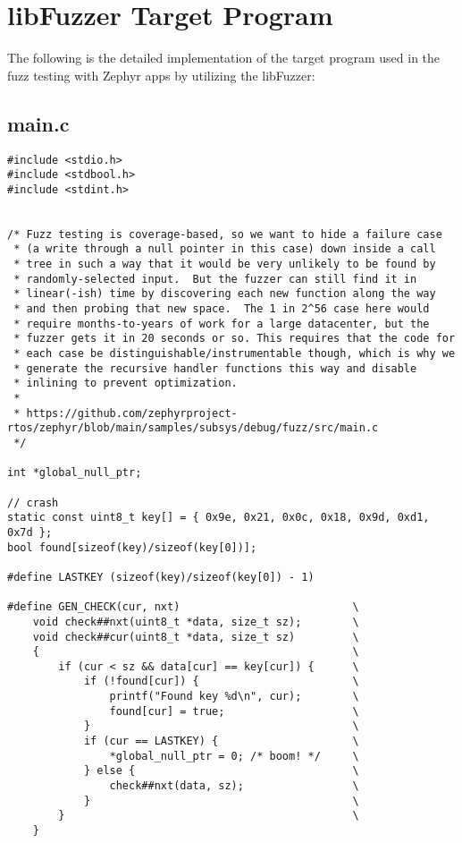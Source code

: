 
\chapter{libFuzzer Target Program}\label{appx:second}
The following is the detailed implementation of the
target program\cite{FuzzingE54:online}\cite{zephyrsa35:online} used in
the fuzz testing with Zephyr apps by utilizing the libFuzzer:

\section*{main.c}
\begin{verbatim}
#include <stdio.h>
#include <stdbool.h>
#include <stdint.h>


/* Fuzz testing is coverage-based, so we want to hide a failure case
 * (a write through a null pointer in this case) down inside a call
 * tree in such a way that it would be very unlikely to be found by
 * randomly-selected input.  But the fuzzer can still find it in
 * linear(-ish) time by discovering each new function along the way
 * and then probing that new space.  The 1 in 2^56 case here would
 * require months-to-years of work for a large datacenter, but the
 * fuzzer gets it in 20 seconds or so. This requires that the code for
 * each case be distinguishable/instrumentable though, which is why we
 * generate the recursive handler functions this way and disable
 * inlining to prevent optimization.
 *
 * https://github.com/zephyrproject-rtos/zephyr/blob/main/samples/subsys/debug/fuzz/src/main.c
 */

int *global_null_ptr;

// crash
static const uint8_t key[] = { 0x9e, 0x21, 0x0c, 0x18, 0x9d, 0xd1, 0x7d };
bool found[sizeof(key)/sizeof(key[0])];

#define LASTKEY (sizeof(key)/sizeof(key[0]) - 1)

#define GEN_CHECK(cur, nxt)                           \
    void check##nxt(uint8_t *data, size_t sz);        \
    void check##cur(uint8_t *data, size_t sz)         \
    {                                                 \
        if (cur < sz && data[cur] == key[cur]) {      \
            if (!found[cur]) {                        \
                printf("Found key %d\n", cur);        \
                found[cur] = true;                    \
            }                                         \
            if (cur == LASTKEY) {                     \
                *global_null_ptr = 0; /* boom! */     \
            } else {                                  \
                check##nxt(data, sz);                 \
            }                                         \
        }                                             \
    }


\end{verbatim}

